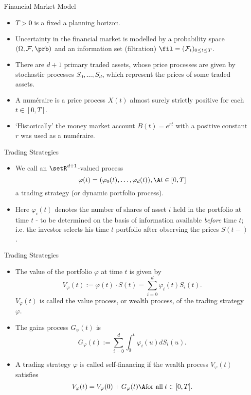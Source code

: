 { Financial Market Model}
\begin{itemize}
\item<1->
$T>0$ is a fixed a planning horizon.
\item<2->
Uncertainty in the financial market is modelled by a probability
space $(\Omega, {\cal F},\prb)$ and an information set  (filtration) $\fil =({\cal
F}_t)_{0\leq t\leq T}$.
\item<3->
There are $d+1$ primary traded assets, whose price processes are
given by stochastic processes $S_0, \ldots, S_d$, which represent
the prices of some traded assets.
\item<4->
A num\'{e}raire is a price process $X(t)$ almost surely strictly
positive for each $t \in [0,T]$.
\item<5->
\lq {Historically}' the money market account $B(t)=e^{rt}$ with a
positive constant $r$ was used as a
num\'{e}raire.
\end{itemize}

{ Trading Strategies}

\begin{itemize}
\item<1->  We call an $\setR^{d+1}$-valued process
$$
\varphi(t) = (\varphi_0(t), \ldots, \varphi_d(t)), \A t \in [0,T]
$$
a trading strategy (or dynamic portfolio process).
\item<2->
Here $\varphi_i(t)$ denotes the number of shares of asset $i$ held
in the portfolio at time $t$ - to be determined on the basis of
information available {\it before} time $t$; i.e. the investor
selects his time $t$ portfolio after observing the prices $S(t-)$.
\end{itemize}

{ Trading Strategies}
\begin{itemize}
\item<1->  The value of the portfolio $\varphi$ at time $t$ is
given by
$$
V_\varphi(t) :=  \varphi(t) \cdot S(t) = \sum_{i=0}^d \varphi_i(t)
S_i(t).
$$
$V_\varphi(t)$ is called the value process, or wealth process, of
the trading strategy $\varphi$.\ \item<2-> The gains process
$G_\varphi(t)$ is
$$
G_\varphi(t) := \sum_{i=0}^d \int_0^t \varphi_i(u) dS_i(u).
$$
\item<3-> A trading strategy $\varphi$ is called self-financing if
the wealth process $V_\varphi(t)$ satisfies
$$
V_\varphi(t) = V_\varphi(0) + G_\varphi(t)\A \mbox{for all}\; t\in
[0,T].
$$
\end{itemize}

